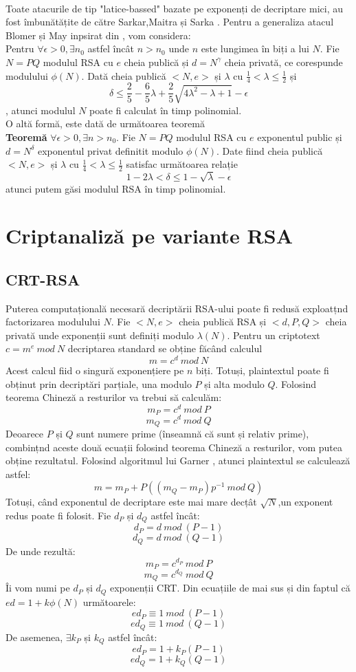 \documentclass[12]{report}
\begin{document}
\\
Toate atacurile de tip "latice-bassed" bazate pe exponenți de decriptare mici, au fost îmbunătățite de către Sarkar,Maitra și Sarka \cite{sarkar}. Pentru a generaliza atacul Blomer și May inpsirat din \cite{sarkar}, vom considera: \\
Pentru $\forall \epsilon > 0, \exists n_0$ astfel încât $n>n_0$ unde $n$ este lungimea în biți a lui $N$. Fie $N=PQ$ modulul RSA cu $e$ cheia publică și $d=N^{\gamma}$ cheia privată, ce corespunde modulului $\phi(N)$. Dată cheia publică $<N,e>$ și $\lambda$ cu $\frac{1}{4}<\lambda\leqslant \frac{1}{2}$ și 
$$ \delta \leqslant \frac{2}{5} - \frac{6}{5}\lambda + \frac{2}{5} \sqrt{4\lambda^{2}- \lambda +1} - \epsilon $$,
atunci modulul $N$ poate fi calculat în timp polinomial. \\
O altă formă, este dată de următoarea teoremă \\
\textbf{Teoremă} $\forall \epsilon > 0, \exists n >n_0$. Fie $N=PQ$ modulul RSA cu $e$ exponentul public și $d=N^{\delta}$ exponentul privat definitit modulo $\phi(N)$. Date fiind cheia publică $<N,e>$ și $\lambda$ cu $\frac{1}{4} < \lambda \leqslant \frac{1}{2} $ satisfac următoarea relație
$$ 1- 2\lambda < \delta \leqslant 1 - \sqrt{\lambda}-\epsilon$$
atunci putem găsi modulul RSA în timp polinomial.
\section{Criptanaliză pe variante RSA}
\subsection{CRT-RSA}
Puterea computațională necesară decriptării RSA-ului poate fi redusă exploatțnd factorizarea modulului $N$. Fie $<N,e>$ cheia publică RSA și $<d,P,Q>$ cheia privată unde exponenții sunt definiți modulo $\lambda(N)$. Pentru un criptotext $c=m^e \ mod \ N$ decriptarea standard se obține făcând calculul
$$ m=c^d \ mod \ N$$
Acest calcul fiid o singură exponențiere pe $n$ biți. Totuși, plaintextul poate fi obținut prin decriptări parțiale, una modulo $P$ și alta modulo $Q$. Folosind teorema Chineză a resturilor  va trebui să calculăm:
$$ m_P = c^d \ mod \ P$$
$$ m_Q = c^d \ mod \ Q$$
Deoarece $P$ și $Q$ sunt numere prime (înseamnă că sunt și relativ prime), combințnd aceste două ecuații folosind teorema Chineză a resturilor, vom putea obține rezultatul. Folosind algoritmul lui Garner \cite{garner}, atunci plaintextul se calculează astfel:
$$ m=m_P+P((m_Q-m_P)p^{-1} \ mod \ Q)$$
Totuși, când exponentul de decriptare este mai mare decțât $\sqrt{N}$,un exponent redus poate fi folosit. Fie $d_P$ și $d_Q$ astfel încât:
$$ d_P = d \ mod \ (P-1) $$
$$ d_Q = d \ mod \ (Q-1) $$
De unde rezultă:
$$ m_P = c^{d_P} \ mod \ P $$
$$ m_Q = c^{d_Q} \ mod \ Q $$
Îi vom numi pe $ d_P $ și $d_Q$ exponenții CRT. Din ecuațiile de mai sus și din faptul că $ed = 1+ k\phi(N)$ următoarele:
$$ ed_P \equiv 1 \ mod \ (P-1)$$
$$ ed_Q \equiv 1 \ mod \ (Q-1)$$
De asemenea, $\exists k_P$ și $k_Q$ astfel încât:
$$ ed_P = 1 + k_P(P-1)$$
$$ ed_Q = 1+ k_Q(Q-1)$$
\end{document}
